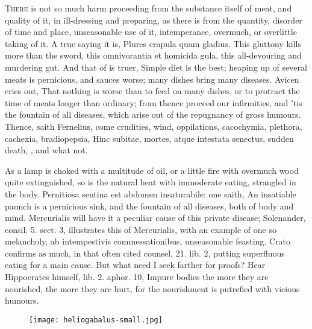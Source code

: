 {{\lettrine{T}{here} is not so much harm proceeding from the substance itself of meat,
and quality of it, in ill-dressing and preparing, as there is from the
quantity, disorder of time and place, unseasonable use of it, 
intemperance, overmuch, or overlittle taking of it. A true saying it
is, Plures crapula quam gladius. This gluttony kills more than the
sword, this omnivorantia et homicida gula, this all-devouring and
murdering gut. And that of \Pliny{} is truer, Simple diet is the
best; heaping up of several meats is pernicious, and sauces worse; many
dishes bring many diseases. Avicen cries out, That nothing is
worse than to feed on many dishes, or to protract the time of meats
longer than ordinary; from thence proceed our infirmities, and 'tis the
fountain of all diseases, which arise out of the repugnancy of gross
humours. Thence, saith  Fernelius, come crudities, wind,
oppilations, cacochymia, plethora, cachexia, bradiopepsia, Hinc
subitae, mortes, atque intestata senectus, sudden death, \etc{}, and what
not.

As a lamp is choked with a multitude of oil, or a little fire with
overmuch wood quite extinguished, so is the natural heat with
immoderate eating, strangled in the body. Pernitiosa sentina est
abdomen insaturabile: one saith, An insatiable paunch is a pernicious
sink, and the fountain of all diseases, both of body and mind.
Mercurialis will have it a peculiar cause of this private
disease; Solenander, consil. 5. sect. 3, illustrates this of
Mercurialis, with an example of one so melancholy, ab intempestivis
commessationibus, unseasonable feasting. Crato confirms as much,
in that often cited counsel, 21. lib. 2, putting superfluous eating for
a main cause. But what need I seek farther for proofs? Hear
Hippocrates himself, lib. 2. aphor. 10, Impure bodies the more
they are nourished, the more they are hurt, for the nourishment is
putrefied with vicious humours.

\begin{figure}[H]
  \begingroup
  \centering
  \texttt{[image: heliogabalus-small.jpg]}
  \label{fig:heliogabalus}
\end{figure}

}}
